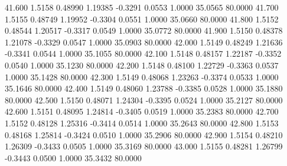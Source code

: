   41.600   1.5158   0.48990   1.19385  -0.3291   0.0553   1.0000  35.0565  80.0000
  41.700   1.5155   0.48749   1.19952  -0.3304   0.0551   1.0000  35.0660  80.0000
  41.800   1.5152   0.48544   1.20517  -0.3317   0.0549   1.0000  35.0772  80.0000
  41.900   1.5150   0.48378   1.21078  -0.3329   0.0547   1.0000  35.0903  80.0000
  42.000   1.5149   0.48249   1.21636  -0.3341   0.0544   1.0000  35.1055  80.0000
  42.100   1.5148   0.48157   1.22187  -0.3352   0.0540   1.0000  35.1230  80.0000
  42.200   1.5148   0.48100   1.22729  -0.3363   0.0537   1.0000  35.1428  80.0000
  42.300   1.5149   0.48068   1.23263  -0.3374   0.0533   1.0000  35.1646  80.0000
  42.400   1.5149   0.48060   1.23788  -0.3385   0.0528   1.0000  35.1880  80.0000
  42.500   1.5150   0.48071   1.24304  -0.3395   0.0524   1.0000  35.2127  80.0000
  42.600   1.5151   0.48095   1.24814  -0.3405   0.0519   1.0000  35.2383  80.0000
  42.700   1.5152   0.48128   1.25316  -0.3414   0.0514   1.0000  35.2643  80.0000
  42.800   1.5153   0.48168   1.25814  -0.3424   0.0510   1.0000  35.2906  80.0000
  42.900   1.5154   0.48210   1.26309  -0.3433   0.0505   1.0000  35.3169  80.0000
  43.000   1.5155   0.48281   1.26799  -0.3443   0.0500   1.0000  35.3432  80.0000
